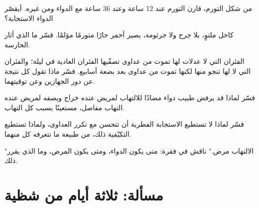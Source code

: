 \begin{exercise}[$\star\star$]\label{exo:g12:innate-immunity:10}
من شكل التورم، قارن التورم عند 12 ساعة وعند 36 ساعة مع الدواء ومن
غيره. أيقصّر الدواء الاستجابة؟
\end{exercise}

\begin{exercise}[$\star\star$]\label{exo:g12:innate-immunity:11}
كاحل ملتوٍ، بلا جرح ولا جرثومة، يصير أحمر حارًا متورمًا مؤلمًا. فسّر ما
الذي أثار  الحارسة.
\end{exercise}

\begin{exercise}[$\star\star\star$]\label{exo:g12:innate-immunity:12}
الفئران التي لا عدلات لها تموت من عداوى تصفّيها الفئران العادية في
ليلة؛ والفئران التي لا  لها تنجو منها لكنها تموت من عداوى
بعد بضعة أسابيع. فسّر ماذا تقول كل نتيجة عن دور الجهازين وعن توقيتهما.
\end{exercise}

\begin{exercise}[$\star\star\star$]\label{exo:g12:innate-immunity:13}
فسّر لماذا قد يرفض طبيب دواء مضادًا للالتهاب لمريض عنده خراج ويصفه
لمريض عنده التهاب مفاصل، مستعينًا بسبب كل التهاب.
\end{exercise}

\begin{exercise}[$\star\star\star$]\label{exo:g12:innate-immunity:14}
فسّر لماذا لا تستطيع الاستجابة الفطرية أن تتحسن مع تكرر العداوى،
ولماذا تستطيع التكيّفية ذلك، من طبيعة ما تتعرفه كل منهما.
\end{exercise}

\begin{exercise}[$\star\star\star$]\label{exo:g12:innate-immunity:15}
"الالتهاب مرض." ناقش في فقرة: متى يكون الدواء، ومتى يكون المرض، وما
الذي يقرر ذلك.
\end{exercise}

\section{مسألة: ثلاثة أيام من شظية}

